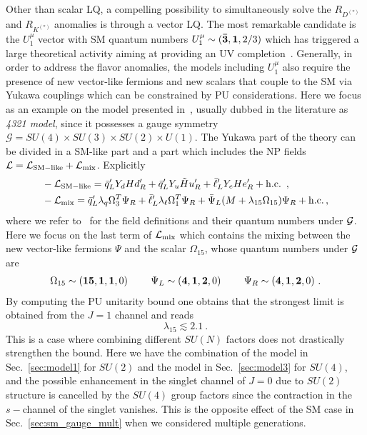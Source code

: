 \documentclass[a4paper,11pt]{article}
\newcommand{\be}{\begin{equation}}
\newcommand{\ee}{\end{equation}}
\newcommand{\nn}{\nonumber}
\begin{document}
Other than scalar LQ, a compelling possibility to simultaneously solve the $R_{D^{(*)}}$ and $R_{K^{(*)}}$ anomalies is through a  vector LQ. The most remarkable candidate is the $U_1^\mu$ vector with SM quantum numbers $U_1^\mu\sim({\bf \bar 3}, {\bf 1}, 2/3)$ which has triggered a large theoretical activity aiming at providing an UV completion~\cite{Alonso:2015sja,Calibbi:2015kma,Buttazzo:2017ixm,Kumar:2018kmr,Barbieri:2015yvd,DiLuzio:2017vat,DiLuzio:2018zxy,Bordone:2017bld,Barbieri:2017tuq,Calibbi:2017qbu,Azatov:2018kzb,Blanke:2018sro,Fuentes-Martin:2020bnh,Greljo:2021npi}.
Generally, in order to address the flavor anomalies, the models including $U_1^\mu$ also require the presence of new vector-like fermions and new scalars that couple to the SM via Yukawa couplings which can be constrained by PU considerations.
Here we focus as an example on the model presented in~\cite{DiLuzio:2018zxy}, usually dubbed in the literature as {\emph{4321 model}}, since it possesses a 
gauge symmetry $\mathcal{G}=SU(4)\times SU(3)\times SU(2) \times U(1)$. The Yukawa part of the theory can be divided in a SM-like part and a part which includes the NP fields $\mathcal{L}=\mathcal{L}_{\rm SM-like}+\mathcal{L}_{\rm mix}$. Explicitly
\begin{align}
&- \mathcal{L}_{\rm SM-like} =\bar{q}^\prime_L Y_d H d^\prime_R+\bar{q}^\prime_L Y_u \tilde{H} u^\prime_R+\bar{\ell}^\prime_L Y_e H e^\prime_R +\rm{h.c.}\, \ , \nn \\
%
&- \mathcal{L}_{\rm mix} =\bar{q}^\prime_L \lambda_q \Omega^T_3 \Psi_R+\bar{\ell}^\prime_L \lambda_\ell \Omega^T_1 \Psi_R+\bar{\Psi}_L( M+\lambda_{15} \Omega_{15} )\Psi_R+\rm{h.c.}\, , 
\end{align}
where we refer to~\cite{DiLuzio:2018zxy} for the field definitions and their quantum numbers under ${\cal G}$. Here we focus on the last term of $\mathcal{L}_{\rm mix}$
which contains the mixing between the new vector-like fermions $\Psi$ and the scalar $\Omega_{15}$, whose quantum numbers under ${\cal G}$ are
\begin{equation}
\begin{array}{ccc}
\Omega_{15}\sim ({\bf 15},{\bf 1},{\bf 1},0)~~~~& \Psi_L \sim ({\bf 4},{\bf 1},{\bf 2},0)~~~~&\Psi_R \sim ({\bf 4},{\bf 1},{\bf 2},0)\ .
\end{array}
\end{equation}
By computing the PU unitarity bound one obtains that the strongest limit is obtained from the $J=1$ channel and reads
\be
\lambda_{15}\lesssim 2.1  \ .
\ee
This is a case where combining different $SU(N)$ factors does not drastically strengthen the bound. Here we have the combination of the model in Sec.~\ref{sec:model1} for $SU(2)$ and the model in Sec.~\ref{sec:model3} for $SU(4)$,  and the possible enhancement in the singlet channel of $J=0$ due to $SU(2)$ structure is cancelled by the $SU(4)$  group factors since the contraction in the $s-$channel of the singlet vanishes. This is the opposite effect of the SM case in Sec.~\ref{sec:sm_gauge_mult} when we considered multiple generations.
\end{document}
